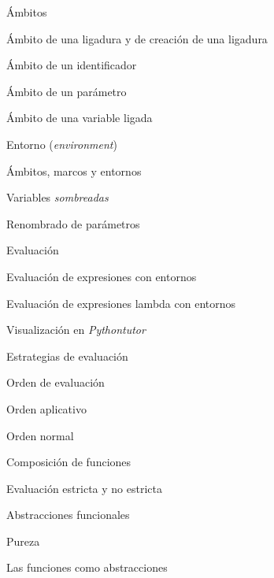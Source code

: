 \begin{longenum}
\begin{longenum}
        \begin{longenum}
            \item Ámbitos
            \item Ámbito de una ligadura y de creación de una ligadura
            \item Ámbito de un identificador
            \item Ámbito de un parámetro
            \item Ámbito de una variable ligada
            \item Entorno (\textit{environment})
            \item Ámbitos, marcos y entornos
            \item Variables \textit{sombreadas}
            \item Renombrado de parámetros
        \end{longenum}
        \item Evaluación
        \begin{longenum}
            \item Evaluación de expresiones con entornos
            \item Evaluación de expresiones lambda con entornos
            \begin{longenum}
                \item Visualización en \textit{Pythontutor}
            \end{longenum}
            \item Estrategias de evaluación
            \begin{longenum}
                \item Orden de evaluación
                \begin{longenum}
                    \item Orden aplicativo
                    \item Orden normal
                \end{longenum}
                \item Composición de funciones
                \item Evaluación estricta y no estricta
            \end{longenum}
        \end{longenum}
        \item Abstracciones funcionales
        \begin{longenum}
            \item Pureza
            \item Las funciones como abstracciones

\end{longenum}
\end{longenum}
\end{longenum}
